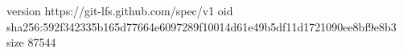version https://git-lfs.github.com/spec/v1
oid sha256:592f342335b165d77664e6097289f10014d61e49b5df11d1721090ee8bf9e8b3
size 87544
